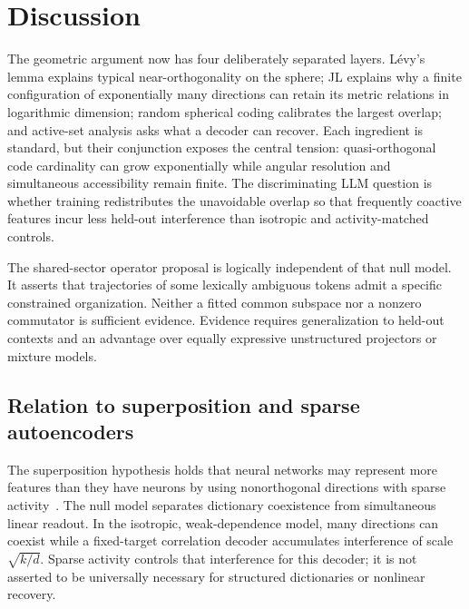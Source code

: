 \documentclass[
  aps,
  reprint,
  superscriptaddress,
  floatfix,
  nofootinbib,
  longbibliography
]{revtex4-2}
\begin{document}
\section{Discussion}
\label{sec:discussion}

The geometric argument now has four deliberately separated layers.  L\'evy's
lemma explains typical near-orthogonality on the sphere; JL explains why a
finite configuration of exponentially many directions can retain its metric
relations in logarithmic dimension; random spherical coding calibrates the
largest overlap; and active-set analysis asks what a decoder can recover.
Each ingredient is standard, but their conjunction exposes the central
tension: quasi-orthogonal code cardinality can grow exponentially while angular
resolution and simultaneous accessibility remain finite.  The discriminating
LLM question is whether training redistributes the unavoidable overlap so that
frequently coactive features incur less held-out interference than isotropic
and activity-matched controls.

The shared-sector operator proposal is logically independent of that null
model.  It asserts that trajectories of some lexically ambiguous tokens admit a
specific constrained organization.  Neither a fitted common subspace nor a
nonzero commutator is sufficient evidence.  Evidence requires generalization
to held-out contexts and an advantage over equally expressive unstructured
projectors or mixture models.

\subsection{Relation to superposition and sparse autoencoders}
\label{sec:superposition}

The superposition hypothesis holds that neural networks may represent more
features than they have neurons by using nonorthogonal directions with sparse
activity~\cite{elhage2022superposition,bricken2023monosemanticity}.  The null
model separates dictionary coexistence from simultaneous linear readout.  In
the isotropic, weak-dependence model, many directions can coexist while a
fixed-target correlation decoder accumulates interference of scale
$\sqrt{k/d}$.  Sparse activity controls that interference for this decoder;
it is not asserted to be universally necessary for structured dictionaries or
nonlinear recovery.
\end{document}
